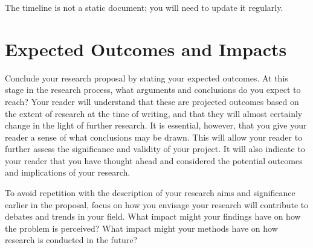 \documentclass[12pt, a4paper]{article}
\begin{document}
The timeline is not a static document; you will need to update it regularly.


\section{Expected Outcomes and Impacts}
Conclude your research proposal by stating your expected outcomes. At this stage in the research process, what arguments and conclusions do you expect to reach? Your reader will understand that these are projected outcomes based on the extent of research at the time of writing, and that they will almost certainly change in the light of further research. It is essential, however, that you give your reader a sense of what conclusions may be drawn. This will allow your reader to further assess the significance and validity of your project. It will also indicate to your reader that you have thought ahead and considered the potential outcomes and implications of your research.

To avoid repetition with the description of your research aims and significance earlier in the proposal, focus on how you envisage your research will contribute to debates and trends in your field. What impact might your findings have on how the problem is perceived? What impact might your methods have on how research is conducted in the future?




\end{document}
